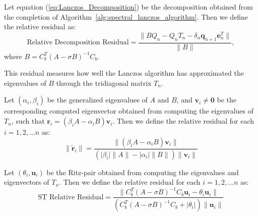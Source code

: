 \begin{definition}\label{def:DecompositionResidual}
	Let equation (\ref{eq:Lanczos_Decomposition}) be the decomposition obtained from the completion of Algorithm~\ref{alg:spectral_lanczos_algorithm}. Then we define the relative residual as:
	\begin{equation}\label{eq:DecompositionResidual}
		\text{Relative Decomposition Residual} = \frac{\|BQ_n - Q_nT_n - \delta_{n}\mathbf{q}_{n+1}\mathbf{e}_n^T\|}{\|B\|},
	\end{equation}
	where $B = C_b^T (A-\sigma B)^{-1} C_b $.
\end{definition}
This residual measures how well the Lanczos algorithm has approximated the eigenvalues of $B$ through the tridiagonal matrix $T_n$.

\begin{definition}\label{def:GeneralizedRelativeResidual}
	Let $(\alpha_i, \beta_i)$ be the generalized eigenvalues of $A$ and $B$, and $\mathbf{v}_i \neq \mathbf{0}$ be the corresponding computed eigenvector obtained from computing the eigenvalues of $T_n$, such that $\mathbf{r}_i = (\beta_i A - \alpha_i B)\mathbf{v}_i$. Then we define the relative residual for each $i = 1, 2, \ldots n$ as:
	\begin{equation}\label{eq:GeneralizedResidual}
		\|\tilde{\mathbf{r}}_i\| = \frac{\| (\beta_i A - \alpha_i B)\mathbf{v}_i \| }{(\lvert \beta_i \rvert \|A\| - \lvert \alpha_i \rvert \|B\|)\|\mathbf{v}_i\| }
	\end{equation}
\end{definition}

\begin{definition}\label{def:SpectralTransformedResidual}
	Let $(\theta_i, \mathbf{u}_i)$ be the Ritz-pair obtained from computing the eigenvalues and eigenvectors of $T_n$. Then we define the relative residual for each $i = 1, 2, \ldots n$ as:
	\begin{equation}\label{eq:STResidual}
		\text{ST Relative Residual} = \frac{\| C_b^T(A - \sigma B)^{-1}C_b \mathbf{u}_i - \theta_i \mathbf{u}_i \| }{( C_b^T(A - \sigma B)^{-1}C_b + \lvert \theta_i \rvert)\|\mathbf{u}_i\| }
	\end{equation}
\end{definition}

